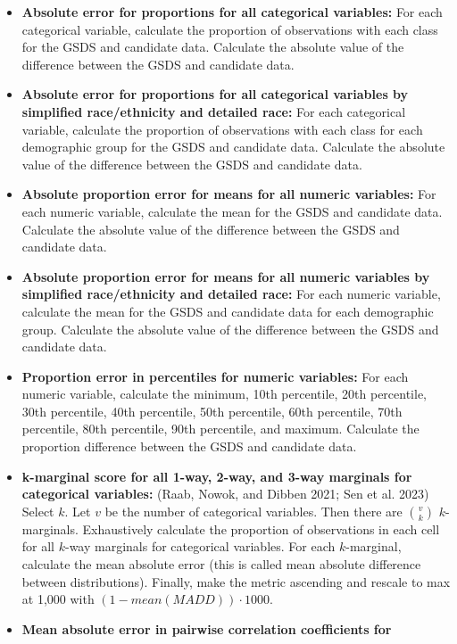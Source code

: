 \documentclass[
]{urban-formatting}
\begin{document}
\begin{itemize}
\item
  \textbf{Absolute error for proportions for all categorical variables:}
  For each categorical variable, calculate the proportion of
  observations with each class for the GSDS and candidate data.
  Calculate the absolute value of the difference between the GSDS and
  candidate data.
\item
  \textbf{Absolute error for proportions for all categorical variables
  by simplified race/ethnicity and detailed race:} For each categorical
  variable, calculate the proportion of observations with each class for
  each demographic group for the GSDS and candidate data. Calculate the
  absolute value of the difference between the GSDS and candidate data.
\item
  \textbf{Absolute proportion error for means for all numeric
  variables:} For each numeric variable, calculate the mean for the GSDS
  and candidate data. Calculate the absolute value of the difference
  between the GSDS and candidate data.
\item
  \textbf{Absolute proportion error for means for all numeric variables
  by simplified race/ethnicity and detailed race:} For each numeric
  variable, calculate the mean for the GSDS and candidate data for each
  demographic group. Calculate the absolute value of the difference
  between the GSDS and candidate data.
\item
  \textbf{Proportion error in percentiles for numeric variables:} For
  each numeric variable, calculate the minimum, 10th percentile, 20th
  percentile, 30th percentile, 40th percentile, 50th percentile, 60th
  percentile, 70th percentile, 80th percentile, 90th percentile, and
  maximum. Calculate the proportion difference between the GSDS and
  candidate data.
\item
  \textbf{k-marginal score for all 1-way, 2-way, and 3-way marginals for
  categorical variables:} (Raab, Nowok, and Dibben 2021; Sen et al.
  2023) Select \(k\). Let \(v\) be the number of categorical variables.
  Then there are \({v \choose k}\) \(k\)-marginals. Exhaustively
  calculate the proportion of observations in each cell for all
  \(k\)-way marginals for categorical variables. For each
  \(k\)-marginal, calculate the mean absolute error (this is called mean
  absolute difference between distributions). Finally, make the metric
  ascending and rescale to max at 1,000 with
  \((1 - mean(MADD)) \cdot 1000\).
\item
  \textbf{Mean absolute error in pairwise correlation coefficients for
}
\end{itemize}
\end{document}
